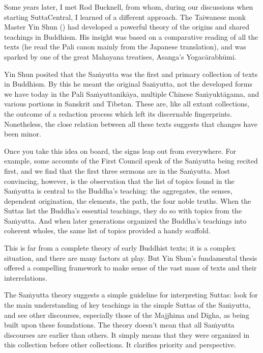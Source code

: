 \documentclass[12pt,openany]{book}%
\newcommand*{\langlzh}[1]{\cjk{#1}\normalfont}%
\begin{document}
Some years later, I met Rod Bucknell, from whom, during our discussions when starting SuttaCentral, I learned of a different approach. The Taiwanese monk Master Yin Shun (\langlzh{印順}) had developed a powerful theory of the origins and shared teachings in Buddhism. His insight was based on a comparative reading of all the texts (he read the Pali canon mainly from the Japanese translation), and was sparked by one of the great Mahayana treatises, Asanga’s \textsanskrit{Yogacārabhūmi}. 

Yin Shun posited that the \textsanskrit{Saṁyutta} was the first and primary collection of texts in Buddhism. By this he meant the original \textsanskrit{Saṁyutta}, not the developed forms we have today in the Pali \textsanskrit{Saṁyuttanikāya}, multiple Chinese \textsanskrit{Saṁyuktāgama}, and various portions in Sanskrit and Tibetan. These are, like all extant collections, the outcome of a redaction process which left its discernable fingerprints. Nonetheless, the close relation between all these texts suggests that changes have been minor.

Once you take this idea on board, the signs leap out from everywhere. For example, some accounts of the First Council speak of the \textsanskrit{Saṁyutta} being recited first, and we find that the first three sermons are in the \textsanskrit{Saṁyutta}. Most convincing, however, is the observation that the list of topics found in the \textsanskrit{Saṁyutta} is central to the Buddha’s teaching: the aggregates, the senses, dependent origination, the elements, the path, the four noble truths. When the Suttas list the Buddha’s essential teachings, they do so with topics from the \textsanskrit{Saṁyutta}. And when later generations organized the Buddha’s teachings into coherent wholes, the same list of topics provided a handy scaffold.

This is far from a complete theory of early Buddhist texts; it is a complex situation, and there are many factors at play. But Yin Shun’s fundamental thesis offered a compelling framework to make sense of the vast mass of texts and their interrelations.

The \textsanskrit{Saṁyutta} theory suggests a simple guideline for interpreting Suttas: look for the main understanding of key teachings in the simple Suttas of the \textsanskrit{Saṁyutta}, and see other discourses, especially those of the Majjhima and \textsanskrit{Dīgha}, as being built upon these foundations. The theory doesn’t mean that all \textsanskrit{Saṁyutta} discourses are earlier than others. It simply means that they were organized in this collection before other collections. It clarifies priority and perspective.
\end{document}
